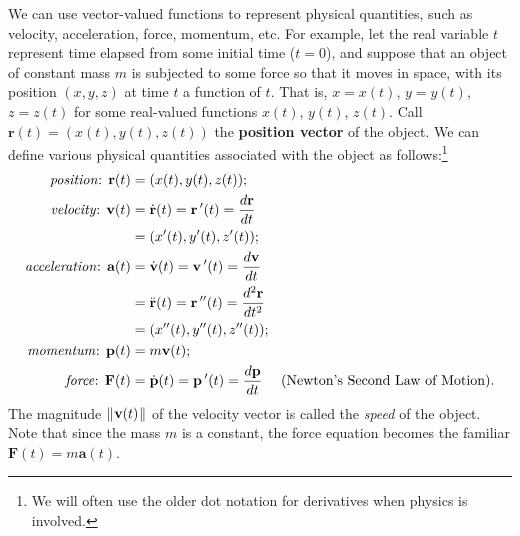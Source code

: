 We can use vector-valued functions to represent physical quantities, such as velocity, acceleration, force, momentum, etc. 
For example, let the real variable $t$ represent time elapsed from some initial time ($t = 0$), and suppose
that an object of constant mass $m$ is subjected to some force so that it moves in space, with its position $(x,y,z)$ at
time $t$ a function of $t$. That is, $x = x(t)$, $y = y(t)$, $z = z(t)$ for some real-valued functions $x(t)$, $y(t)$,
$z(t)$. Call $\textbf{r}(t) = (x(t),y(t),z(t))$ the \textbf{position vector} of the object. We
can define various physical quantities associated with the object as follows:\footnote{We will often use the
older dot notation for derivatives when physics is involved.}
\begin{align*}
 \text{\emph{position}: } \textbf{r}(t) &= (x(t),y(t),z(t));\\
 \text{\emph{velocity}: } \textbf{v}(t) &= \dot{\textbf{r}}(t) = \textbf{r}\,'(t) = \dfrac{d \textbf{r}}{dt}\\
 &= (x'(t),y'(t),z'(t));\\
 \text{\emph{acceleration}: } \textbf{a}(t) &= \dot{\textbf{v}}(t) = \textbf{v}\,'(t) = \dfrac{d \textbf{v}}{dt}\\
 &= \ddot{\textbf{r}}(t) = \textbf{r}\,''(t) = \dfrac{d^2 \textbf{r}}{dt^2}\\
 &= (x''(t),y''(t),z''(t));\\
 \text{\emph{momentum}: } \textbf{p}(t) &= m \textbf{v}(t);\\
 \text{\emph{force}: } \textbf{F}(t) &= \dot{\textbf{p}}(t) = \textbf{p}\,'(t) = \dfrac{d \textbf{p}}{dt}
 \text{~~~~(Newton's Second Law of Motion).}
\end{align*}
The magnitude $\lVert\mspace{1mu}\textbf{v}(t)\mspace{1mu}\rVert$ of the velocity vector is called the \emph{speed} of the object.
Note that since the mass $m$ is a constant, the force equation becomes the familiar
$\textbf{F}(t) = m \textbf{a}(t)$.

